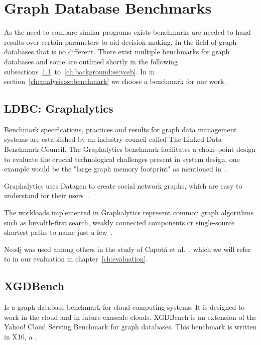 \section{Graph Database Benchmarks}
\label{ch:background:se:graphDatabaseBenchmarks}
As the need to compare similar programs exists benchmarks are needed to hand results over certain parameters to aid decision making.
In the field of graph databases that is no different.
There exist multiple benchmarks for graph databases and some are outlined shortly in the following subsections~\ref{ch:background:se:ldbcGraphalytics}~to~\ref{ch:background:se:ycsb}.
In in section~\ref{ch:analysis:se:benchmark} we choose a benchmark for our work.

\subsection{LDBC: Graphalytics}
\label{ch:background:se:ldbcGraphalytics}
Benchmark specifications, practices and results for graph data management systems are established by an industry council called The Linked Data Benchmark Council.
The Graphalytics benchmark facilitates a choke-point design to evaluate the crucial technological challenges present in system design,
one example would be the "large graph memory footprint" as mentioned in~\cite[2]{Capota2015c}.

Graphalytics uses Datagen to create social network graphs,
which are easy to understand for their users~\cite[3]{Capota2015c}.

The workloads implemented in Graphalytics represent common graph algorithms such as breadth-first search,
weakly connected components or single-source shortest paths to name just a few~\cite[7]{Iosup}.

Neo4j was used among others in the study of Capot\u{a} et al.~\cite{Capota2015c},
which we will refer to in our evaluation in chapter~\ref{ch:evaluation}.

\subsection{XGDBench}
Is a graph database benchmark for cloud computing systems.
It is designed to work in the cloud and in future exascale clouds.
XGDBench is an extension of the Yahoo! Cloud Serving Benchmark for graph databases.
This benchmark is written in X10,
a .

